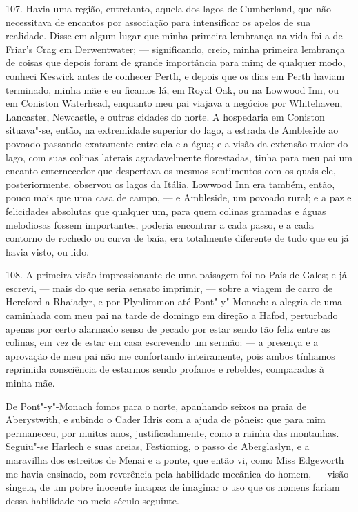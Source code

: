 107. Havia uma região, entretanto, aquela dos lagos de Cumberland, que
não necessitava de encantos por associação para intensificar os apelos
de sua realidade. Disse em algum lugar que minha primeira lembrança na
vida foi a de Friar's Crag em Derwentwater; --- significando, creio,
minha primeira lembrança de coisas que depois foram de grande
importância para mim; de qualquer modo, conheci Keswick antes de
conhecer Perth, e depois que os dias em Perth haviam terminado, minha
mãe e eu ficamos lá, em Royal Oak, ou na Lowwood Inn, ou em Coniston
Waterhead, enquanto meu pai viajava a negócios por Whitehaven,
Lancaster, Newcastle, e outras cidades do norte. A hospedaria em
Coniston situava"-se, então, na extremidade superior do lago, a estrada
de Ambleside ao povoado passando exatamente entre ela e a água; e a
visão da extensão maior do lago, com suas colinas laterais
agradavelmente florestadas, tinha para meu pai um encanto enternecedor
que despertava os mesmos sentimentos com os quais ele, posteriormente,
observou os lagos da Itália. Lowwood Inn era também, então, pouco mais
que uma casa de campo, --- e Ambleside, um povoado rural; e a paz e
felicidades absolutas que qualquer um, para quem colinas gramadas e
águas melodiosas fossem importantes, poderia encontrar a cada passo, e a
cada contorno de rochedo ou curva de baía, era totalmente diferente de
tudo que eu já havia visto, ou lido.

108. A primeira visão impressionante de uma paisagem foi no País de
Gales; e já escrevi, --- mais do que seria sensato imprimir, --- sobre a
viagem de carro de Hereford a Rhaiadyr, e por Plynlimmon até
Pont"-y"-Monach: a alegria de uma caminhada com meu pai na tarde de
domingo em direção a Hafod, perturbado apenas por certo alarmado senso
de pecado por estar sendo tão feliz entre as colinas, em vez de estar em
casa escrevendo um sermão: --- a presença e a aprovação de meu pai não me
confortando inteiramente, pois ambos tínhamos reprimida consciência de
estarmos sendo profanos e rebeldes, comparados à minha mãe.

De Pont"-y"-Monach fomos para o norte, apanhando seixos na praia de
Aberystwith, e subindo o Cader Idris com a ajuda de pôneis: que para mim
permaneceu, por muitos anos, justificadamente, como a rainha das
montanhas. Seguiu"-se Harlech e suas areias, Festioniog, o passo de
Aberglaslyn, e a maravilha dos estreitos de Menai e a ponte, que então
vi, como Miss Edgeworth me havia ensinado, com reverência pela
habilidade mecânica do homem, --- visão singela, de um pobre inocente
incapaz de imaginar o uso que os homens fariam dessa habilidade no meio
século seguinte.

